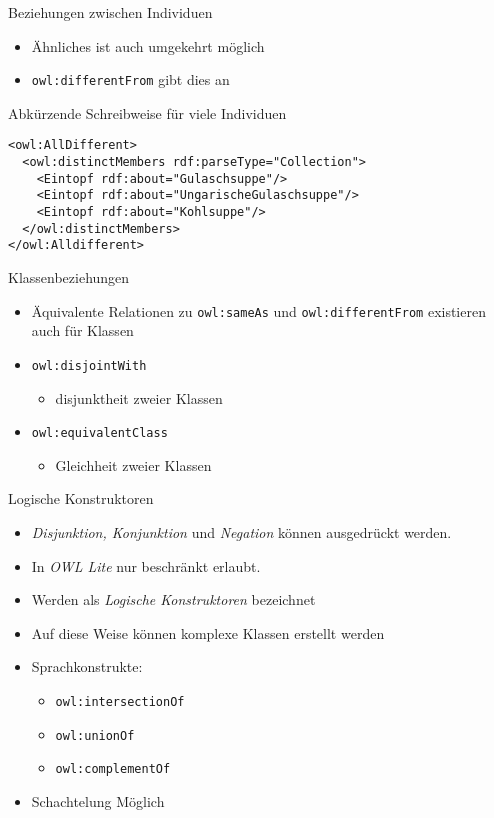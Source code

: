 \documentclass{beamer}
\begin{document}
\begin{frame}[fragile]{Beziehungen zwischen Individuen}
\begin{itemize}
\item Ähnliches ist auch umgekehrt möglich
\item \texttt{owl:differentFrom} gibt dies an
\end{itemize}
\begin{block}{Abkürzende Schreibweise für viele Individuen}
\begin{lstlisting}[lang="xml"]
<owl:AllDifferent>
  <owl:distinctMembers rdf:parseType="Collection">
    <Eintopf rdf:about="Gulaschsuppe"/>
    <Eintopf rdf:about="UngarischeGulaschsuppe"/>
    <Eintopf rdf:about="Kohlsuppe"/>
  </owl:distinctMembers>
</owl:Alldifferent>
\end{lstlisting}
\end{block}

\end{frame}
%
\begin{frame}[fragile]{Klassenbeziehungen}
\begin{itemize}
\item Äquivalente Relationen zu \texttt{owl:sameAs} und \texttt{owl:differentFrom}
existieren auch für Klassen
\item \texttt{owl:disjointWith}
\begin{itemize}
 \item disjunktheit zweier Klassen
\end{itemize}
\item \texttt{owl:equivalentClass}
\begin{itemize}
 \item Gleichheit zweier Klassen
\end{itemize}
\end{itemize}
\end{frame}
%
\begin{frame}[fragile]{Logische Konstruktoren}
\begin{itemize}
\item \emph{Disjunktion, Konjunktion} und \emph{Negation} können
ausgedrückt werden.
\item In \emph{OWL Lite} nur beschränkt erlaubt.
\item Werden als \emph{Logische Konstruktoren} bezeichnet
\item Auf diese Weise können komplexe Klassen erstellt werden
\item Sprachkonstrukte:
\begin{itemize}
\item \texttt{owl:intersectionOf}
\item \texttt{owl:unionOf}
\item \texttt{owl:complementOf}
\end{itemize}
\item Schachtelung Möglich
\end{itemize}
\end{frame}
\end{document}
